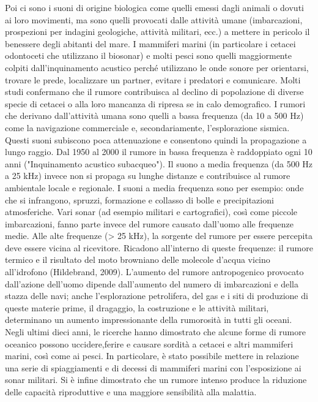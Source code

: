 Poi ci sono i suoni di origine biologica come quelli emessi dagli animali o dovuti ai loro movimenti, ma sono quelli provocati dalle attività umane (imbarcazioni, prospezioni per indagini geologiche, attività militari, ecc.) a mettere in pericolo il benessere degli abitanti del mare. 
I mammiferi marini (in particolare i cetacei odontoceti che utilizzano il biosonar) e molti pesci sono quelli maggiormente colpiti dall’inquinamento acustico perché utilizzano le onde sonore per orientarsi, trovare le prede, localizzare un partner, evitare i predatori e comunicare. 
Molti studi confermano che il rumore contribuisca al declino di popolazione di diverse specie di cetacei o alla loro mancanza di ripresa se in calo demografico. 
I rumori che derivano dall’attività umana sono quelli a bassa frequenza (da 10 a 500 Hz) come la navigazione commerciale e, secondariamente, l’esplorazione sismica. 
Questi suoni subiscono poca attenuazione e consentono quindi la propagazione a lungo raggio. 
Dal 1950 al 2000 il rumore in bassa frequenza è raddoppiato ogni 10 anni ("Inquinamento acustico subacqueo"). 
Il suono a media frequenza (da 500 Hz a 25 kHz) invece non si propaga su lunghe distanze e contribuisce al rumore ambientale locale e regionale. 
I suoni a media frequenza sono per esempio: onde che si infrangono, spruzzi, formazione e collasso di bolle e precipitazioni atmosferiche. Vari sonar (ad esempio militari e cartografici), così come piccole imbarcazioni, fanno parte invece del rumore causato dall’uomo alle frequenze medie. 
Alle alte frequenze (> 25 kHz), la sorgente del rumore per essere percepita deve essere vicina al ricevitore. 
Ricadono all’interno di queste frequenze: il rumore termico e il risultato del moto browniano delle molecole d'acqua vicino all'idrofono (Hildebrand, 2009).
L’aumento del rumore antropogenico provocato dall’azione dell’uomo dipende dall’aumento del numero di imbarcazioni e della stazza delle navi; anche l'esplorazione petrolifera, del gas e i siti di produzione di queste materie prime, il dragaggio, la costruzione e le attività militari, determinano un aumento impressionante della rumorosità in tutti gli oceani. Negli ultimi dieci anni, le ricerche hanno dimostrato che alcune forme di rumore oceanico possono uccidere,ferire e causare sordità a cetacei e altri mammiferi marini, così come ai pesci. 
In particolare, è stato possibile mettere in relazione una serie di spiaggiamenti e di decessi di mammiferi marini con l'esposizione ai sonar militari. 
Si è infine dimostrato che un rumore intenso produce la riduzione delle capacità riproduttive e una maggiore sensibilità alla malattia.



